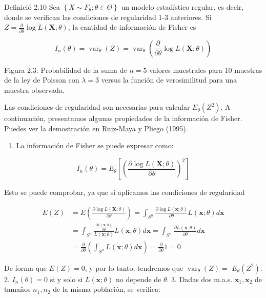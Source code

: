 \documentclass[
]{article}
\providecommand{\tightlist}{%
  \setlength{\itemsep}{0pt}\setlength{\parskip}{0pt}}
\begin{document}
Definició 2.10 Sea \(\left\{X \sim F_{\theta}: \theta \in \Theta\right\}\) un modelo estadístico regular, es decir, donde se verifican las condiciones de regularidad 1-3 anteriores. Si \(Z=\frac{\partial}{\partial \theta} \log L(\mathbf{X} ; \theta)\), la cantidad de información de Fisher es

\[
I_{n}(\theta)=\operatorname{var}_{\theta}(Z)=\operatorname{var}_{\theta}\left(\frac{\partial}{\partial \theta} \log L(\mathbf{X} ; \theta)\right)
\]

Figura 2.3: Probabilidad de la suma de \(n=5\) valores muestrales para 10 muestras de la ley de Poisson con \(\lambda=3\) versus la función de verosimilitud para una muestra observada.

Las condiciones de regularidad son necesarias para calcular \(E_{\theta}\left(Z^{2}\right)\).
A continuación, presentamos algunas propiedades de la información de Fisher. Puedes ver la demostración en Ruiz-Maya y Pliego (1995).

\begin{enumerate}
\def\labelenumi{\arabic{enumi}.}
\tightlist
\item
  La información de Fisher se puede expresar como:
\end{enumerate}

\[
I_{n}(\theta)=E_{\theta}\left[\left(\frac{\partial \log L(\mathbf{X} ; \theta)}{\partial \theta}\right)^{2}\right]
\]

Esto se puede comprobar, ya que si aplicamos las condiciones de regularidad

\[
\begin{aligned}
E(Z) & =E\left(\frac{\partial \log L(\mathbf{X} ; \theta)}{\partial \theta}\right)=\int_{S^{n}} \frac{\partial \log L(\mathbf{x} ; \theta)}{\partial \theta} L(\mathbf{x} ; \theta) d \mathbf{x} \\
& =\int_{S^{n}} \frac{\frac{\partial L(\mathbf{x} ; \theta)}{\partial \theta}}{L(\mathbf{x} ; \theta)} L(\mathbf{x} ; \theta) d \mathbf{x}=\int_{S^{n}} \frac{\partial L(\mathbf{x} ; \theta)}{\partial \theta} d \mathbf{x} \\
& =\frac{\partial}{\partial \theta}\left(\int_{S^{n}} L(\mathbf{x} ; \theta) d \mathbf{x}\right)=\frac{\partial}{\partial \theta} 1=0
\end{aligned}
\]

De forma que \(E(Z)=0\), y por lo tanto, tendremos que \(\operatorname{var}_{\theta}(Z)=\) \(E_{\theta}\left(Z^{2}\right)\).
2. \(I_{n}(\theta)=0\) si y solo si \(L(\mathbf{x} ; \theta)\) no depende de \(\theta\).
3. Dadas dos m.a.s. \(\mathbf{x}_{1}, \mathbf{x}_{2}\) de tamaños \(n_{1}, n_{2}\) de la misma población, se verifica:
\end{document}
